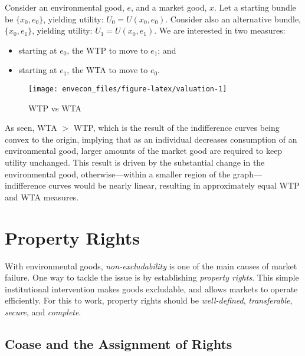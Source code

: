 \documentclass[
]{book}
\providecommand{\tightlist}{%
  \setlength{\itemsep}{0pt}\setlength{\parskip}{0pt}}
\begin{document}
Consider an environmental good, \(e\), and a market good, \(x\). Let a starting bundle be \(\{x_0,e_0\}\), yielding utility: \(U_0 = U(x_0,e_0)\). Consider also an alternative bundle, \(\{x_0,e_1\}\), yielding utility: \(U_1 = U(x_0,e_1)\). We are interested in two measures:

\begin{itemize}
\tightlist
\item
  starting at \(e_0\), the WTP to move to \(e_1\); and
\item
  starting at \(e_1\), the WTA to move to \(e_0\).
\end{itemize}

\begin{figure}

{\centering \texttt{[image: envecon\_files/figure-latex/valuation-1]} 

}

\caption{WTP vs WTA}\label{fig:valuation}
\end{figure}

As seen, WTA \(>\) WTP, which is the result of the indifference curves being convex to the origin, implying that as an individual decreases consumption of an environmental good, larger amounts of the market good are required to keep utility unchanged. This result is driven by the substantial change in the environmental good, otherwise---within a smaller region of the graph---indifference curves would be nearly linear, resulting in approximately equal WTP and WTA measures.

\hypertarget{property-rights}{%
\chapter{Property Rights}\label{property-rights}}

With environmental goods, \emph{non-excludability} is one of the main causes of market failure. One way to tackle the issue is by establishing \emph{property rights}. This simple institutional intervention makes goods excludable, and allows markets to operate efficiently. For this to work, property rights should be \emph{well-defined}, \emph{transferable}, \emph{secure}, and \emph{complete}.

\hypertarget{coase-and-the-assignment-of-rights}{%
\section{Coase and the Assignment of Rights}\label{coase-and-the-assignment-of-rights}}
\end{document}
